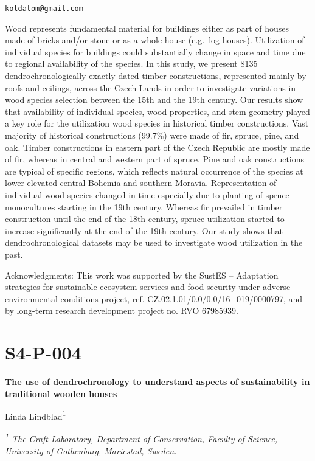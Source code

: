 \documentclass[
]{book}
\begin{document}
\href{mailto:koldatom@gmail.com}{\nolinkurl{koldatom@gmail.com}}

Wood represents fundamental material for buildings either as part of houses made of bricks and/or stone or as a whole house (e.g.~log houses). Utilization of individual species for buildings could substantially change in space and time due to regional availability of the species. In this study, we present 8135 dendrochronologically exactly dated timber constructions, represented mainly by roofs and ceilings, across the Czech Lands in order to investigate variations in wood species selection between the 15th and the 19th century. Our results show that availability of individual species, wood properties, and stem geometry played a key role for the utilization wood species in historical timber constructions. Vast majority of historical constructions (99.7\%) were made of fir, spruce, pine, and oak. Timber constructions in eastern part of the Czech Republic are mostly made of fir, whereas in central and western part of spruce. Pine and oak constructions are typical of specific regions, which reflects natural occurrence of the species at lower elevated central Bohemia and southern Moravia. Representation of individual wood species changed in time especially due to planting of spruce monocultures starting in the 19th century. Whereas fir prevailed in timber construction until the end of the 18th century, spruce utilization started to increase significantly at the end of the 19th century. Our study shows that dendrochronological datasets may be used to investigate wood utilization in the past.

Acknowledgments: This work was supported by the SustES -- Adaptation strategies for sustainable ecosystem services and food security under adverse environmental conditions project, ref. CZ.02.1.01/0.0/0.0/16\_019/0000797, and by long-term research development project no. RVO 67985939.

\hypertarget{s4-p-004}{%
\section*{S4-P-004}\label{s4-p-004}}

\textbf{The use of dendrochronology to understand aspects of sustainability in traditional wooden houses}

Linda Lindblad\textsuperscript{1}

\emph{\textsuperscript{1} The Craft Laboratory, Department of Conservation, Faculty of Science, University of Gothenburg, Mariestad, Sweden.}
\end{document}
